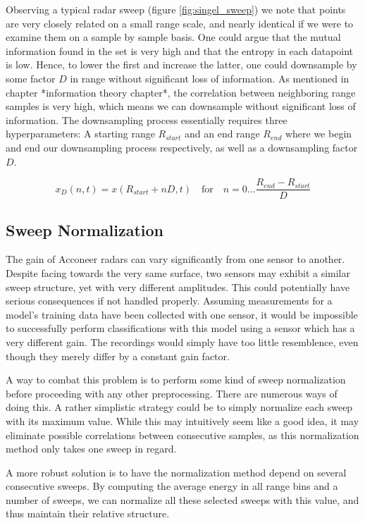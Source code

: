 Observing a typical radar sweep (figure \ref{fig:singel_sweep}) we note that points are very closely related on a small range scale, and nearly identical if we were to examine them on a sample by sample basis. One could argue that the mutual information found in the set is very high and that the entropy in each datapoint is low. Hence, to lower the first and increase the latter, one could downsample by some factor $D$ in range without significant loss of information.
As mentioned in chapter *information theory chapter*, the correlation between neighboring range samples is very high, which means we can downsample without significant loss of information. The downsampling process essentially requires three hyperparameters: A starting range $R_{start}$ and an end range $R_{end}$ where we begin and end our downsampling process respectively, as well as a downsampling factor $D$.

\begin{equation}
	x_D(n, t) = x(R_{start} + nD, t) \quad \text{for}\quad n=0...\frac{R_{end}-R_{start}}{D}
\end{equation}

\subsection{Sweep Normalization}
The gain of Acconeer radars can vary significantly from one sensor to another. Despite facing towards the very same surface, two sensors may exhibit a similar sweep structure,  yet with very different amplitudes. This could potentially have serious consequences if not handled properly. Assuming measurements for a model's training data have been collected with one sensor, it would be impossible to successfully perform classifications with this model using a sensor which has a very different gain. The recordings would simply have too little resemblence, even though they merely differ by a constant gain factor.

A way to combat this problem is to perform some kind of sweep normalization before proceeding with any other preprocessing. There are numerous ways of doing this. A rather simplistic strategy could be to simply normalize each sweep with its maximum value. While this may intuitively seem like a good idea, it may eliminate possible correlations between consecutive samples, as this normalization method only takes one sweep in regard. 

A more robust solution is to have the normalization method depend on several consecutive sweeps. By computing the average energy in all range bins and a number of sweeps, we can normalize all these selected sweeps with this value, and thus maintain their relative structure.

